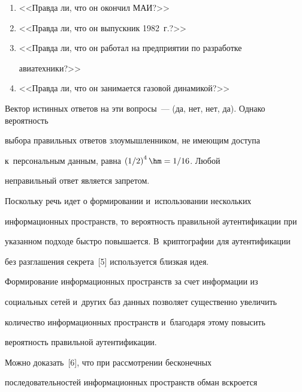   \begin{enumerate}[1.]


\item <<Правда ли, что он окончил МАИ?>>


\item <<Правда ли, что он выпускник 1982~г.?>>


\item <<Правда ли, что он работал на предприятии по разработке 


авиатехники?>>


\item <<Правда ли, что он занимается газовой динамикой?>>


\end{enumerate}





Вектор истинных ответов на эти вопросы~--- (да, нет, нет, да). Однако вероятность 


выбора правильных ответов злоумышленником, не имеющим доступа 


к~персональным данным, равна $\left( 1/2\right)^4\hm=1/16$. Любой 


неправильный ответ является запретом. 





  Поскольку речь идет о формировании и~использовании нескольких 


информационных пространств, то вероятность правильной аутентификации при 


указанном подходе быстро повышается. В~криптографии для аутентификации 


без разглашения секрета~[5] используется близкая идея. 


  


  Формирование информационных пространств за счет информации из 


социальных сетей и~других баз данных позволяет существенно увеличить 


количество информационных пространств и~благодаря этому повысить 


вероятность правильной аутентификации. 


  


  Можно доказать~[6], что при рассмотрении бесконечных 


последовательностей информационных пространств обман вскроется 


